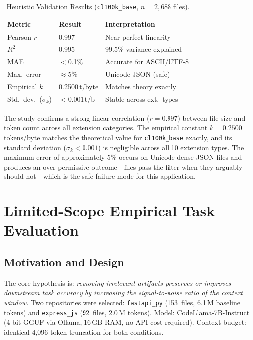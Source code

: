\documentclass[conference]{IEEEtran}
\begin{document}
\begin{table}[t]
  \centering
  \caption{Heuristic Validation Results (\texttt{cl100k\_base},
  $n{=}2{,}688$ files).}
  \label{tab:validation}
  \renewcommand{\arraystretch}{1.15}
  \begin{tabular}{@{}lll@{}}
    \toprule
    \textbf{Metric} & \textbf{Result} & \textbf{Interpretation} \\
    \midrule
    Pearson $r$              & 0.997          & Near-perfect linearity   \\
    $R^2$                    & 0.995          & 99.5\% variance explained\\
    MAE                      & $<$0.1\%       & Accurate for ASCII/UTF-8 \\
    Max.\ error              & $\approx$5\%   & Unicode JSON (safe)      \\
    Empirical $k$            & 0.2500\,t/byte & Matches theory exactly   \\
    Std.\ dev.\ ($\sigma_k$) & $<$0.001\,t/b  & Stable across ext.\ types\\
    \bottomrule
  \end{tabular}
\end{table}

The study confirms a strong linear correlation ($r{=}0.997$) between
file size and token count across all extension categories. The
empirical constant $k{=}0.2500$ tokens/byte matches the theoretical
value for \texttt{cl100k\_base} exactly, and its standard deviation
($\sigma_k < 0.001$) is negligible across all 10 extension types.
The maximum error of approximately 5\% occurs on Unicode-dense JSON
files and produces an over-permissive outcome---files pass the filter
when they arguably should not---which is the safe failure mode for
this application.

\section{Limited-Scope Empirical Task Evaluation}

\subsection{Motivation and Design}

The core hypothesis is: \textit{removing irrelevant artifacts preserves
or improves downstream task accuracy by increasing the signal-to-noise
ratio of the context window.}
Two repositories were selected:
\texttt{fastapi\_py} (153~files, 6.1\,M baseline tokens) and
\texttt{express\_js} (92~files, 2.0\,M tokens).
Model: CodeLlama-7B-Instruct (4-bit GGUF via Ollama, 16\,GB RAM,
no API cost required).
Context budget: identical 4,096-token truncation for both conditions.
\end{document}
